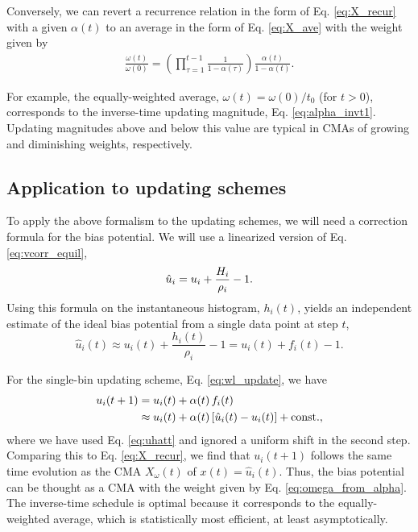 \documentclass[preprint, superscriptaddress, floatfix]{revtex4-1}
\begin{document}
Conversely, we can revert a recurrence relation
in the form of Eq. \eqref{eq:X_recur}
with a given $\alpha(t)$
to an average in the form of Eq. \eqref{eq:X_ave}
with the weight given by
\begin{align}
  \frac{ \omega(t) } { \omega(0) }
  =
  \left(
    \prod_{\tau=1}^{t-1} \frac{1}{1- \alpha(\tau)}
  \right)
  \frac{ \alpha(t) } { 1 - \alpha(t) }
  .
  \label{eq:omega_from_alpha}
\end{align}

For example,
the equally-weighted average, $\omega(t) = \omega(0)/t_0$ (for $t > 0$),
corresponds to the inverse-time updating magnitude,
Eq. \eqref{eq:alpha_invt1}.
%
Updating magnitudes above and below this value
are typical in CMAs of
growing and diminishing weights, respectively.


\subsection{\label{sec:ave_us}
Application to updating schemes}

To apply the above formalism to the updating schemes,
we will need a correction formula for the bias potential.
%
We will use a linearized version of Eq. \eqref{eq:vcorr_equil},
%
\begin{equation}
  \hat u_i = u_i + \frac{ H_i } { \rho_i } -1
  .
  \notag
\end{equation}
%
Using this formula on
the instantaneous histogram, $h_i(t)$,
yields an independent estimate of the ideal bias potential
from a single data point at step $t$,
%
\begin{equation}
  \hat u_i(t)
  \approx u_i(t) + \frac{ h_i(t) } { \rho_i } - 1
  = u_i(t) + f_i(t) - 1
  .
  \label{eq:uhatt}
\end{equation}

For the single-bin updating scheme, Eq. \eqref{eq:wl_update},
we have
\begin{align}
  u_i(t+1)
  &=
  u_i(t) + \alpha(t) \, f_i(t)
  \notag \\
  &\approx
  u_i(t) + \alpha(t) \, [\hat u_i(t) - u_i(t)] + \mathrm{const.}
  ,
  \notag
\end{align}
where we have used Eq. \eqref{eq:uhatt}
and ignored a uniform shift in the second step.
%
Comparing this to Eq. \eqref{eq:X_recur},
we find that $u_i(t+1)$ follows the same time evolution
as the CMA $X_\omega(t)$ of $x(t) = \hat u_i(t)$.
%
Thus, the bias potential can be thought as
a CMA with the weight given by Eq. \eqref{eq:omega_from_alpha}.
%
The inverse-time schedule is optimal
because it corresponds to the equally-weighted average,
which is statistically most efficient, at least asymptotically.
\end{document}
